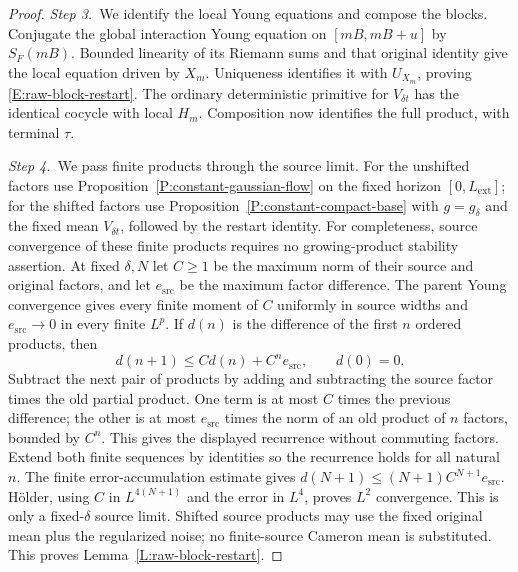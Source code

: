 \begin{proof}
  \medskip
  \noindent\textit{Step 3.~}We identify the local Young equations and compose
  the blocks.
  Conjugate the global interaction Young equation on $[mB,mB+u]$ by $S_F(mB)$.
  Bounded linearity of its Riemann sums and that original identity give the
  local equation driven by $X_m$. Uniqueness identifies it with $U_{X_m}$,
  proving \eqref{E:raw-block-restart}. The ordinary deterministic primitive for
  $V_{\delta t}$ has the identical cocycle with local $H_m$. Composition now
  identifies the full product, with terminal $\tau$.


  \medskip
  \noindent\textit{Step 4.~}We pass finite products through the source limit.
  For the unshifted factors use Proposition~\ref{P:constant-gaussian-flow} on
  the fixed horizon $[0,L_{\mathrm{ext}}]$; for the shifted factors use
  Proposition~\ref{P:constant-compact-base} with $g=g_\delta$ and the fixed
  mean $V_{\delta t}$, followed by the restart identity.
  For completeness, source convergence of these finite products requires no
  growing-product stability assertion. At fixed $\delta,N$ let $C \ge 1$ be the
  maximum norm of their source and original factors, and let $e_{\mathrm{src}}$
  be the maximum factor difference. The parent Young convergence gives every
  finite moment of $C$ uniformly in source widths and $e_{\mathrm{src}} \to 0$
  in every finite $L^p$. If $d(n)$ is the difference of the first $n$ ordered
  products, then
  \[
    d(n+1)\le C d(n)+C^n e_{\mathrm{src}},\qquad d(0)=0.
  \]
  Subtract the next pair of products by adding and subtracting the source
  factor times the old partial product. One term is at most $C$ times the
  previous difference; the other is at most $e_{\mathrm{src}}$ times the norm
  of an old product of $n$ factors, bounded by $C^n$. This gives the displayed
  recurrence without commuting factors.
  Extend both finite sequences by identities so the recurrence holds for all
  natural $n$. The finite error-accumulation estimate gives $d(N+1) \le
  (N+1)C^{N+1}e_{\mathrm{src}}$. H\"older, using $C$ in $L^{4(N+1)}$ and the
  error in $L^4$, proves $L^2$ convergence. This is only a fixed-$\delta$ source
  limit. Shifted source products may use the fixed original mean plus the
  regularized noise; no finite-source Cameron mean is substituted. This proves
  Lemma~\ref{L:raw-block-restart}.
\end{proof}



